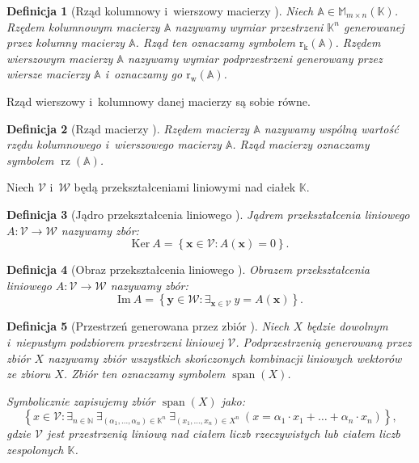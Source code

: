 \documentclass[12pt,a4paper]{report}
\newtheorem{df}{Definicja}[chapter]
\newcommand{\set}[1]{\left\lbrace {#1} \right\rbrace}
\newcommand{\setK}{\mathbb{K}}
\newcommand{\setN}{\mathbb{N}}
\newcommand{\przestrzen}[1]{\operatorname{span}\left({#1} \right)}
\newcommand{\rw}[1]{\operatorname{r_w}\left({#1} \right)}
\newcommand{\rk}[1]{\operatorname{r_k}\left({#1} \right)}
\newcommand{\rz}[1]{\operatorname{rz}\left({#1} \right)}
\begin{document}
\begin{df}[Rząd kolumnowy i~wierszowy macierzy {\citep[Sec 8.1]{alzega}}]
Niech $\mathbb{A} \in \mathbb{M}_{m\times n}(\setK)$. Rzędem kolumnowym macierzy $\mathbb{A}$ nazywamy wymiar przestrzeni $\setK^n$ generowanej przez kolumny macierzy $\mathbb{A}$. Rząd ten oznaczamy symbolem $\rk{\mathbb{A}}$. Rzędem wierszowym macierzy $\mathbb{A}$ nazywamy wymiar podprzestrzeni generowany przez wiersze macierzy $\mathbb{A}$ i~oznaczamy go $\rw{\mathbb{A}}$.
\end{df}

Rząd wierszowy i~kolumnowy danej macierzy są sobie równe. 

\begin{df}[Rząd macierzy {\citep[Sec 8.1]{alzega}}]
Rzędem macierzy $\mathbb{A}$ nazywamy wspólną wartość rzędu kolumnowego i~wierszowego macierzy $\mathbb{A}$. Rząd macierzy oznaczamy symbolem $\rz{\mathbb{A}}$.
\end{df}

Niech $\mathcal{V}$ i~$\mathcal{W}$ będą przekształceniami liniowymi nad ciałek $\setK$.
\begin{df}[Jądro przekształcenia liniowego {\citep[Sec 8.1]{alzega}}]
Jądrem przekształcenia liniowego $A: \mathcal{V}\to \mathcal{W}$ nazywamy zbór:
$$
\mathrm{Ker} \: A = \set{ \mathbf{x} \in \mathcal{V} : A(\mathbf{x}) = 0}.
$$
\end{df}

\begin{df}[Obraz przekształcenia liniowego {\citep[Sec 8.1]{alzega}}]
Obrazem przekształcenia liniowego $A: \mathcal{V}\to \mathcal{W}$ nazywamy zbór:
$$
\mathrm{Im} \: A = \set{ \mathbf{y} \in \mathcal{W} : \exists_{\mathbf{x} \in \mathcal{V}} \: y = A(\mathbf{x})}.
$$
\end{df}

\begin{df}[Przestrzeń generowana przez zbiór {\citep[Sec 7.1 Def 7.13]{alzega}}]
Niech $\mathit{X}$ będzie dowolnym i~niepustym podzbiorem przestrzeni liniowej $\mathcal{V}$. Podprzestrzenią generowaną przez zbiór $\mathit{X}$ nazywamy zbiór wszystkich  skończonych kombinacji liniowych wektorów ze zbioru $\mathit{X}$. Zbiór ten oznaczamy symbolem $\przestrzen{\mathit{X}}$.

Symbolicznie zapisujemy zbiór $\przestrzen{\mathit{X}}$ jako:
$$
\set{x \in \mathcal{V} : \exists_{n \in \setN} \: \exists_{(\alpha_1, \ldots, \alpha_n) \in \setK^n } \: \exists_{(x_1, \ldots, x_n) \in \mathit{X}^n} \: (x = \alpha_1 \cdot x_1 + \ldots + \alpha_n \cdot x_n)},
$$
gdzie $\mathcal{V}$ jest przestrzenią liniową nad ciałem liczb rzeczywistych lub ciałem liczb zespolonych $\setK$.
\end{df}
\end{document}
